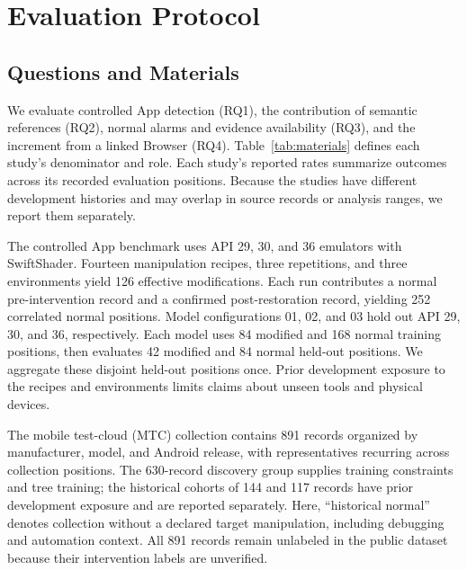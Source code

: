 \hypertarget{sec:4}{%
\section{Evaluation Protocol}\label{sec:4}}

\hypertarget{sec:4-1}{%
\subsection{Questions and Materials}\label{sec:4-1}}

We evaluate controlled App detection (RQ1), the contribution of semantic references (RQ2), normal alarms and evidence availability (RQ3), and the increment from a linked Browser (RQ4). Table~\ref{tab:materials} defines each study's denominator and role. Each study's reported rates summarize outcomes across its recorded evaluation positions. Because the studies have different development histories and may overlap in source records or analysis ranges, we report them separately.



\ifHGMatrix

\fi



The controlled App benchmark uses API 29, 30, and 36 emulators with SwiftShader. Fourteen manipulation recipes, three repetitions, and three environments yield 126 effective modifications. Each run contributes a normal pre-intervention record and a confirmed post-restoration record, yielding 252 correlated normal positions. Model configurations 01, 02, and 03 hold out API 29, 30, and 36, respectively. Each model uses 84 modified and 168 normal training positions, then evaluates 42 modified and 84 normal held-out positions. We aggregate these disjoint held-out positions once. Prior development exposure to the recipes and environments limits claims about unseen tools and physical devices.

The mobile test-cloud (MTC) collection contains 891 records organized by manufacturer, model, and Android release, with representatives recurring across collection positions. The 630-record discovery group supplies training constraints and tree training; the historical cohorts of 144 and 117 records have prior development exposure and are reported separately. Here, ``historical normal'' denotes collection without a declared target manipulation, including debugging and automation context. All 891 records remain unlabeled in the public dataset because their intervention labels are unverified.

